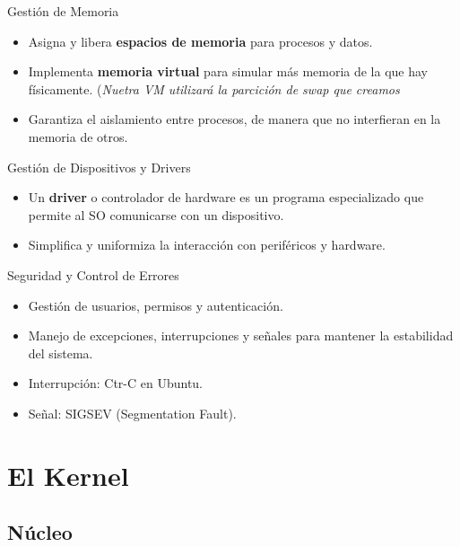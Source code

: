 \documentclass{beamer}
\begin{document}
\begin{frame}{Gestión de Memoria}
    \begin{itemize}
        \item Asigna y libera \textbf{espacios de memoria} para procesos y datos.
        \item Implementa \textbf{memoria virtual} para simular más memoria de la que hay físicamente. (\emph{Nuetra VM utilizará la parcición de swap que creamos}
        \item Garantiza el aislamiento entre procesos, de manera que no interfieran en la memoria de otros.
    \end{itemize}
\end{frame}

\begin{frame}{Gestión de Dispositivos y Drivers}
    \begin{itemize}
        \item Un \textbf{driver} o controlador de hardware es un programa especializado que permite al SO comunicarse con un dispositivo.
        \item Simplifica y uniformiza la interacción con periféricos y hardware.
    \end{itemize}
\end{frame}

\begin{frame}{Seguridad y Control de Errores}
    \begin{itemize}
        \item Gestión de usuarios, permisos y autenticación.
        \item Manejo de excepciones, interrupciones y señales para mantener la estabilidad del sistema.
        \item Interrupción: Ctr-C en Ubuntu.
        \item Señal: SIGSEV (Segmentation Fault).
    \end{itemize}
\end{frame}

\section{El Kernel}
\subsection{Núcleo}
\end{document}
